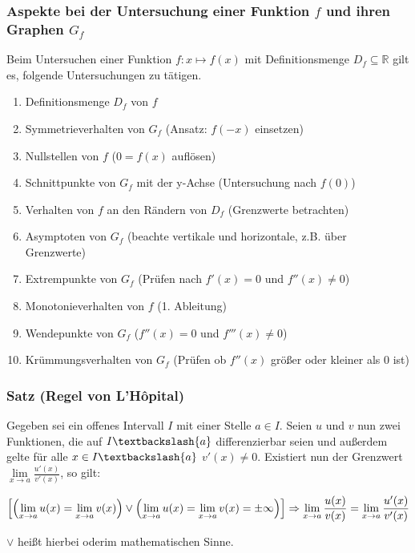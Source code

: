 \documentclass[a4paper,12pt]{article}
\newcommand{\R}{\mathbb{R}}
\begin{document}
\subsubsection{Aspekte bei der Untersuchung einer Funktion $f$ und ihren Graphen $G_f$}
Beim Untersuchen einer Funktion $f:x\mapsto f(x)$ mit Definitionsmenge $D_f \subseteq \R$ gilt es, folgende Untersuchungen zu tätigen.
\begin{enumerate}[(1)]
\item Definitionsmenge $D_f$ von $f$
\item Symmetrieverhalten von $G_f$ (Ansatz: $f(-x)$ einsetzen)
\item Nullstellen von $f$ ($0=f(x)$ auflösen)
\item Schnittpunkte von $G_f$ mit der y-Achse (Untersuchung nach $f(0)$)
\item Verhalten von $f$ an den Rändern von $D_f$ (Grenzwerte betrachten)
\item Asymptoten von $G_f$ (beachte vertikale und horizontale, z.B. über Grenzwerte)
\item Extrempunkte von $G_f$ (Prüfen nach $f'(x)=0$ und $f''(x)\neq 0$)
\item Monotonieverhalten von $f$ (1. Ableitung)
\item Wendepunkte von $G_f$ ($f''(x)=0$ und $f'''(x)\neq 0$)
\item Krümmungsverhalten von $G_f$ (Prüfen ob $f''(x)$ größer oder kleiner als 0 ist)
\end{enumerate}


\subsubsection{Satz (Regel von L'Hôpital)}
Gegeben sei ein offenes Intervall $I$ mit einer Stelle $a\in I$. Seien $u$ und $v$ nun zwei Funktionen, die auf $I \textbackslash \{ a \}$ differenzierbar seien und außerdem gelte für alle $x \in I \textbackslash \{ a \}$ $v'(x)\neq 0$. Existiert nun der Grenzwert $\lim\limits_{x\rightarrow a} \frac{u'(x)}{v'(x)}$, so gilt:

\[ \mleft[ \mleft( \lim\limits_{x \rightarrow a}u(x) = \lim\limits_{x \rightarrow a}v(x) \mright) \lor \mleft( \lim\limits_{x \rightarrow a}u(x) = \lim\limits_{x \rightarrow a}v(x) = \pm \infty \mright) \mright] \Rightarrow \lim\limits_{x \rightarrow a}\dfrac{u(x)}{v(x)} = \lim\limits_{x \rightarrow a}\dfrac{u'(x)}{v'(x)}\]

$\lor$ heißt hierbei \glqq oder\grqq im mathematischen Sinne. 
\end{document}
